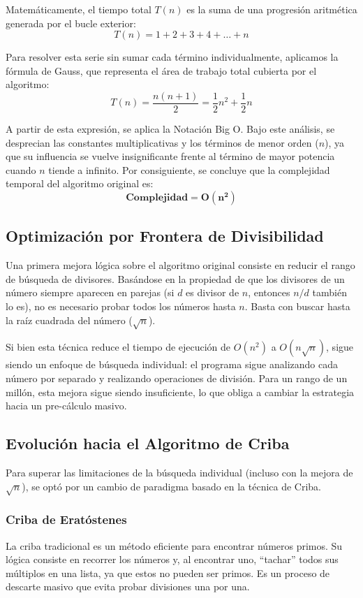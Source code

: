 Matemáticamente, el tiempo total $T(n)$ es la suma de una progresión aritmética generada por el bucle exterior:
$$T(n) = 1 + 2 + 3 + 4 + \dots + n$$

Para resolver esta serie sin sumar cada término individualmente, aplicamos la fórmula de Gauss, que representa el área de trabajo total cubierta por el algoritmo:
$$T(n) = \frac{n(n+1)}{2} = \frac{1}{2}n^2 + \frac{1}{2}n$$

A partir de esta expresión, se aplica la Notación Big O. Bajo este análisis, se desprecian las constantes multiplicativas y los términos de menor orden ($n$), ya que su influencia se vuelve insignificante frente al término de mayor potencia cuando $n$ tiende a infinito. Por consiguiente, se concluye que la complejidad temporal del algoritmo original es:
$$\boxed{\textbf{Complejidad} = \bm{O(n^2)}}$$


\subsection{Optimización por Frontera de Divisibilidad}
Una primera mejora lógica sobre el algoritmo original consiste en reducir el rango de búsqueda de divisores. Basándose en la propiedad de que los divisores de un número siempre aparecen en parejas (si $d$ es divisor de $n$, entonces $n/d$ también lo es), no es necesario probar todos los números hasta $n$. Basta con buscar hasta la raíz cuadrada del número ($\sqrt{n}$).

Si bien esta técnica reduce el tiempo de ejecución de $O(n^2)$ a $O(n \sqrt{n})$, sigue siendo un enfoque de búsqueda individual: el programa sigue analizando cada número por separado y realizando operaciones de división. Para un rango de un millón, esta mejora sigue siendo insuficiente, lo que obliga a cambiar la estrategia hacia un pre-cálculo masivo.

\subsection{Evolución hacia el Algoritmo de Criba}
Para superar las limitaciones de la búsqueda individual (incluso con la mejora de $\sqrt{n}$), se optó por un cambio de paradigma basado en la técnica de Criba.

\subsubsection{Criba de Eratóstenes}
La criba tradicional es un método eficiente para encontrar números primos. Su lógica consiste en recorrer los números y, al encontrar uno, ``tachar'' todos sus múltiplos en una lista, ya que estos no pueden ser primos. Es un proceso de descarte masivo que evita probar divisiones una por una.

